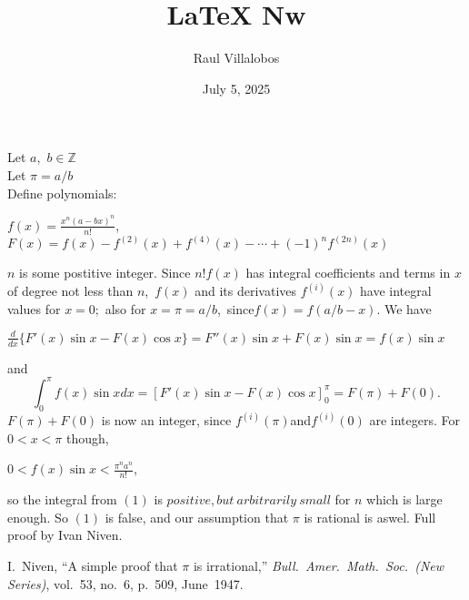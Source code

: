 \documentclass[11pt]{amsart}
\title{LaTeX Nw}
\author{Raul Villalobos}
\date{July 5, 2025}
\begin{document}
\maketitle
Let $a$,~$b \in \mathbb{Z}$ \\
Let $\pi = a/b$ \\
Define polynomials: \\
\begin{center}
$f(x) = \frac{x^{n}(a-bx)^n}{n!}$, \\
\vspace{4pt}
$F(x) = f(x) - f^{(2)}(x)+f^{(4)}(x) - \cdots +(-1)^{n}f^{(2n)}(x)$
\vspace{4pt}
\end{center}

$n$ is some postitive integer. Since $n!f(x)$ has integral coefficients and terms in $x$ of degree not less than $n$,~$f(x)$ and its derivatives $f^{(i)}(x)$ have integral values for $x=0;$ also for $x=\pi=a/b$,~since$f(x)=f(a/b-x)$. We have \\
\begin{center}
$\frac{d}{dx} \{F'(x)\sin x -F(x)\cos x\} = F''(x)\sin x + F(x) \sin x = f(x) \sin x$ \\
\vspace{4pt}
\end{center}
and
\begin{equation}
  \int_{0}^{\pi} f(x) \sin x dx = [F'(x) \sin x - F(x) \cos x]_{0}^{\pi} = F(\pi) + F(0).
\end{equation}
$F(\pi)+F(0)$ is now an integer, since $f^{(i)}(\pi)$and$f^{(i)}(0)$ are integers. For $0<x<\pi$ though,
\begin{center}
$0<f(x)\sin x <\frac{\pi^{n}a^{n}}{n!}$,
\end{center}
so the integral from $(1)$ is $positive, but~arbitrarily~small$ for $n$ which is large enough. So $(1)$ is false, and our assumption that $\pi$ is rational is aswel.
\vspace{4pt}
Full proof by Ivan Niven\cite{Niven}.

\begin{thebibliography}{1}
 I.~Niven, ``A simple proof that $\pi$ is irrational,''
\emph{Bull.\ Amer.\ Math.\ Soc.\ (New Series)}, vol.~53, no.~6, p.~509, June~1947.
\end{thebibliography}
\end{document}
